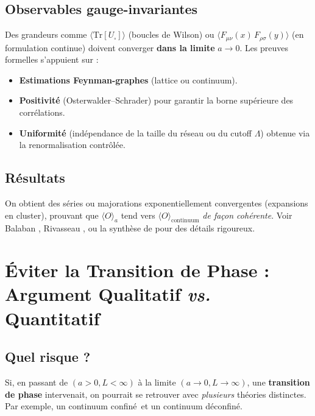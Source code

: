\subsection*{Observables gauge-invariantes}
Des grandeurs comme \(\langle \mathrm{Tr}[U_{\square}]\rangle\) (boucles de Wilson) ou \(\langle F_{\mu\nu}(x)\,F_{\rho\sigma}(y)\rangle\) (en formulation continue) doivent converger \textbf{dans la limite} \(a\to 0\). Les preuves formelles s’appuient sur :
\begin{itemize}
	\item \textbf{Estimations Feynman-graphes} (lattice ou continuum).  
	\item \textbf{Positivité} (Osterwalder--Schrader) pour garantir la borne supérieure des corrélations.  
	\item \textbf{Uniformité} (indépendance de la taille du réseau ou du cutoff \(\Lambda\)) obtenue via la renormalisation contrôlée.
\end{itemize}

\subsection*{Résultats}
On obtient des séries ou majorations exponentiellement convergentes (expansions en cluster), prouvant que \(\langle O\rangle_{a}\) tend vers \(\langle O\rangle_{\mathrm{continuum}}\) \emph{de façon cohérente}. Voir Balaban \cite{Balaban1982-1,Balaban1982-2}, Rivasseau \cite{Rivasseau1991}, ou la synthèse de \cite{Frohlich1982} pour des détails rigoureux.

\vspace{1em}

\section{Éviter la Transition de Phase : Argument Qualitatif \textit{vs.} Quantitatif}
\label{sec:7.3}

\subsection*{Quel risque ?}
Si, en passant de \((a>0, L<\infty)\) à la limite \((a\to 0, L\to \infty)\), une \textbf{transition de phase} intervenait, on pourrait se retrouver avec \emph{plusieurs} théories distinctes. Par exemple, un \og continuum confiné\fg\ et un \og continuum déconfiné\fg.

